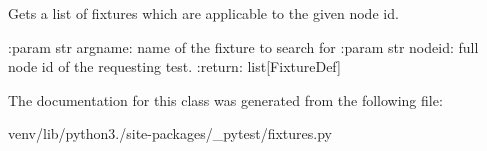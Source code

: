 \begin{DoxyVerb}Gets a list of fixtures which are applicable to the given node id.

:param str argname: name of the fixture to search for
:param str nodeid: full node id of the requesting test.
:return: list[FixtureDef]
\end{DoxyVerb}
 

The documentation for this class was generated from the following file\+:\begin{DoxyCompactItemize}
\item 
venv/lib/python3./site-\/packages/\+\_\+pytest/fixtures.\+py\end{DoxyCompactItemize}
